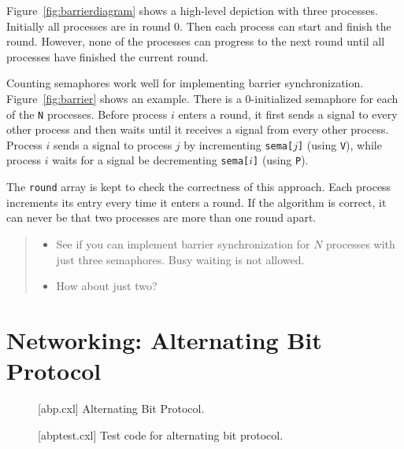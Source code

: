 \documentclass{report}
\newenvironment{code}{
\tcolorbox
}{
\endtcolorbox
}
\begin{document}
Figure~\ref{fig:barrierdiagram} shows a high-level depiction with three
processes.  Initially all processes are in round 0.  Then each process
can start and finish the round.  However, none of the processes can
progress to the next round until all processes have finished the
current round.

Counting semaphores work well for implementing barrier synchronization.
Figure~\ref{fig:barrier} shows an example.  There is a 0-initialized
semaphore for each of the \texttt{N} processes.
Before process $i$ enters a round, it first sends a signal to every
other process and then waits until it receives a signal from
every other process.  Process $i$ sends a signal to process $j$
by incrementing \texttt{sema[$j$]} (using \texttt{V}),
while process $i$ waits for a signal be decrementing \texttt{sema[$i$]}
(using \texttt{P}).

The \texttt{round} array is kept to check the correctness of this
approach.  Each process increments its entry every time it enters
a round.  If the algorithm is correct, it can never be that two processes
are more than one round apart.

\begin{quote}
\begin{itemize}
\item See if you can implement barrier synchronization for $N$ processes
with just three semaphores.  Busy waiting is not allowed.
\item How about just two?
\end{itemize}
\end{quote}

\chapter{Networking: Alternating Bit Protocol}

\begin{figure}
\begin{code}
\end{code}
\caption{[abp.cxl] Alternating Bit Protocol.}
\label{fig:abp}
\end{figure}

\begin{figure}
\begin{code}
\end{code}
\caption{[abptest.cxl] Test code for alternating bit protocol.}
\label{fig:abptest}
\end{figure}
\end{document}
